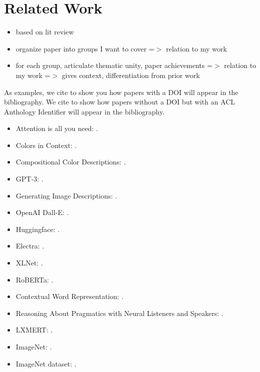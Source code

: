 \section{Related Work}

\begin{itemize}
  \item based on lit review
  \item organize paper into groups I want to cover =$>$ relation to my work
  \item for each group, articulate thematic unity, paper achievements =$>$ relation to my work =$>$ gives context, differentiation from prior work
\end{itemize}

As examples, we cite \citep{vaswani-2017-attention} to show you how papers with a DOI will appear in the bibliography.
We cite \citep{monroe-2017-colors} to show how papers without a DOI but with an ACL Anthology Identifier will appear in the bibliography.

\begin{itemize}
  \item Attention is all you need: \citep{vaswani-2017-attention}.
  \item Colors in Context: \citep{monroe-2017-colors}.
  \item Compositional Color Descriptions: \citep{monroe-2016-compositional}.
  \item GPT-3: \citep{brown-2020-gpt3}.
  \item Generating Image Descriptions: \citep{karpathy-2014-image_descriptions}.
  \item OpenAI Dall-E: \citep{openai-2020-dalle}.
  \item Huggingface: \citep{wolf-2019-huggingface}.
  \item Electra: \citep{clark-2020-electra}.
  \item XLNet: \citep{yang-2019-xlnet}.
  \item RoBERTa: \citep{liu-2019-roberta}.
  \item Contextual Word Representation: \citep{smith-2019-contextual}.
  \item Reasoning About Pragmatics with Neural Listeners and Speakers: \citep{andreas-2016-reasoning}.
  \item LXMERT: \citep{tan-2019-lxmert}.
  \item ImageNet: \citep{deng-2009-imagenet}.
  \item ImageNet dataset: \citep{imagenet-2019-dataset}.
\end{itemize}

